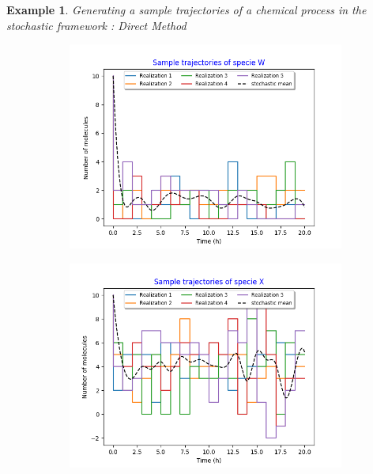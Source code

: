 \documentclass[11pt,a4paper]{article}
\newtheorem{example}[theorem]{Example}
\begin{document}
\begin{example}{Generating a sample trajectories of a chemical process in the stochastic framework : Direct Method}
    \begin{figure}[!h]
    \centering
    \begin{subfigure}{.5\textwidth}
      \centering
        \includegraphics[width=1.1\linewidth]{Images/w_5.png}
        \label{fig: Single sample trajectory}
    \end{subfigure}%
    \begin{subfigure}{.5\textwidth}
      \centering
        \includegraphics[width=1.1\linewidth]{Images/x_5.png}
        \label{fig: Single sample trajectory}
    \end{subfigure}

\end{figure}
\end{example}
\end{document}
